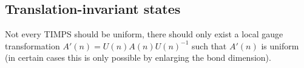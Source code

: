 \subsection{Translation-invariant states}

	\begin{remark}[TIMPS]
		Not every TIMPS should be uniform, there should only exist a local gauge transformation $A'(n) = U(n)A(n)U(n)^{-1}$ such that $A'(n)$ is uniform (in certain cases this is only possible by enlarging the bond dimension).
	\end{remark}
